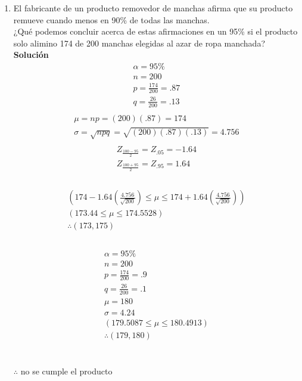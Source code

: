 \documentclass[11pt,a4paper]{article}
\begin{document}
\begin{enumerate}
	
\item El fabricante de un producto removedor de manchas afirma que su producto remueve cuando menos en 90\% de todas las manchas.\\
¿Qué podemos concluir acerca de estas afirmaciones en un  95\% si el producto solo alimino 174 de 200 manchas elegidas al azar de ropa manchada?
	\\\textbf{Solución}
	\begin{gather*}
		\alpha = 95\%\\
		 n	= 200\\
		 p = \frac{174}{200} = .87\\
		 q = \frac{26}{200} = .13\\
	\end{gather*}
	\begin{gather*}
		\mu = np = (200)(.87) = 174\\
		 \sigma = \sqrt{npq} = \sqrt{(200)(.87)(.13)} = 4.756\\
	\end{gather*}
	\begin{gather*}	 
	 Z_{\frac{100 - 95}{2}} = Z_{.05} = -1.64\\
	 Z_{\frac{100 + 95}{2}} = Z_{.95} = 1.64\\
	\end{gather*}\\
	\begin{gather*}	 
	 (174 - 1.64(\frac{4.756}{\sqrt{200}}) \leqslant \mu \leqslant 174 + 1.64(\frac{4.756}{\sqrt{200}}))\\
	 (173.44 \leqslant \mu \leqslant 174.5528)\\
	 \therefore (173,175)\\
	\end{gather*}\\
	\begin{gather*}	 
	 \alpha = 95\%\\
		 n	= 200\\
		 p = \frac{174}{200} = .9\\
		 q = \frac{26}{200} = .1\\
		 \mu = 180\\
		 \sigma = 4.24\\
		 (179.5087 \leqslant \mu \leqslant 180.4913)\\
		 \therefore (179,180)\\
	\end{gather*}\\
	\begin{center}
	$\therefore$ no se cumple el producto\\
	\end{center}
	

\end{enumerate}
\end{document}
